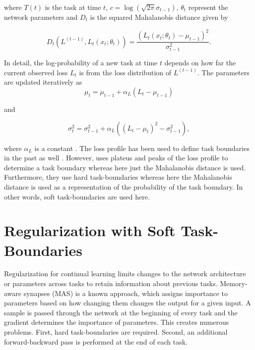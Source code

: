 \documentclass[lettersize,journal]{IEEEtran}
\begin{document}
 \noindent where $T(t)$ is the task at time $t$, $c = \log(\sqrt{2\pi}\sigma_{t-1})$, $\theta_t$ represent the network parameters and $D_t$ is the squared Mahalanobis distance given by 
 
 \begin{equation}
    D_t(L^{(t-1)}, L_{t}(x_t; \theta_{t})) = \frac{(L_{t}(x_t; \theta_{t}) - \mu_{t-1}) ^ 2}{\sigma_{t-1}^2}.
 \end{equation}
  
 \noindent In detail, the log-probability of a new task at time $t$ depends on how far the current observed loss $L_{t}$ is from the loss distribution of $L^{(t-1)}$. The parameters are updated iteratively as
 \begin{equation}
    \mu_{t} = \mu_{t-1} + \alpha_L ( L_{t} - \mu_{t-1})
 \end{equation} 
 
 \noindent and 
 
 \begin{equation}
    \sigma_{t}^2 = \sigma_{t-1}^2 + \alpha_L \left((L_{t} - \mu_{t})^2 - \sigma_{t-1}^2\right),
 \end{equation}
 
 \noindent where $\alpha_L$ is a constant \cite{stauffer1999adaptive}. The loss profile has been used to define task boundaries in the past as well \cite{aljundi2019task}. However,  \cite{aljundi2019task} uses plateus and peaks of the loss profile to determine a task boundary whereas here just the Mahalanobis distance is used. Furthermore, they use hard task-boundaries whereas here the Mahalanobis distance is used as a representation of the probability of the task boundary. In other words, soft task-boundaries are used here.
 
 \section{Regularization with Soft Task-Boundaries}
 \noindent Regularization for continual learning limits changes to the network architecture or parameters across tasks to retain information about previous tasks. Memory-aware synapses (MAS) \cite{aljundi2018memory} is a known approach, which assigns importance to parameters based on how changing them changes the output for a given input. A sample is passed through the network at the beginning of every task and the gradient determines the importance of parameters. This creates numerous problems. First, hard task-boundaries are required. Second, an additional forward-backward pass is performed at the end of each task.
 
\end{document}
